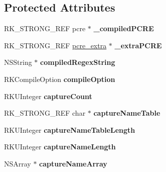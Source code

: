 \subsection*{Protected Attributes}
\begin{DoxyCompactItemize}
\item 
\hypertarget{interface_r_k_regex_aba50ee6e939ad021ecb102f54b8100b9}{R\-K\-\_\-\-S\-T\-R\-O\-N\-G\-\_\-\-R\-E\-F pcre $\ast$ {\bfseries \-\_\-compiled\-P\-C\-R\-E}}\label{interface_r_k_regex_aba50ee6e939ad021ecb102f54b8100b9}

\item 
\hypertarget{interface_r_k_regex_a8e19d0ef588583038126bebf45a48cdd}{R\-K\-\_\-\-S\-T\-R\-O\-N\-G\-\_\-\-R\-E\-F \hyperlink{structpcre__extra}{pcre\-\_\-extra} $\ast$ {\bfseries \-\_\-extra\-P\-C\-R\-E}}\label{interface_r_k_regex_a8e19d0ef588583038126bebf45a48cdd}

\item 
\hypertarget{interface_r_k_regex_ae146bb4ea5f568a5b4ffb541291da639}{N\-S\-String $\ast$ {\bfseries compiled\-Regex\-String}}\label{interface_r_k_regex_ae146bb4ea5f568a5b4ffb541291da639}

\item 
\hypertarget{interface_r_k_regex_a4b15de7c1dadf827b3eb21454686c7f3}{R\-K\-Compile\-Option {\bfseries compile\-Option}}\label{interface_r_k_regex_a4b15de7c1dadf827b3eb21454686c7f3}

\item 
\hypertarget{interface_r_k_regex_a2835832938eec8af92255759fc6278e4}{R\-K\-U\-Integer {\bfseries capture\-Count}}\label{interface_r_k_regex_a2835832938eec8af92255759fc6278e4}

\item 
\hypertarget{interface_r_k_regex_a986245e019741a2c91b2fd6470adef0b}{R\-K\-\_\-\-S\-T\-R\-O\-N\-G\-\_\-\-R\-E\-F char $\ast$ {\bfseries capture\-Name\-Table}}\label{interface_r_k_regex_a986245e019741a2c91b2fd6470adef0b}

\item 
\hypertarget{interface_r_k_regex_a4d23812f239a36f5d6a611ffab3a6938}{R\-K\-U\-Integer {\bfseries capture\-Name\-Table\-Length}}\label{interface_r_k_regex_a4d23812f239a36f5d6a611ffab3a6938}

\item 
\hypertarget{interface_r_k_regex_ac05b2b2d84f5680728b23438c86d9ab5}{R\-K\-U\-Integer {\bfseries capture\-Name\-Length}}\label{interface_r_k_regex_ac05b2b2d84f5680728b23438c86d9ab5}

\item 
\hypertarget{interface_r_k_regex_a0c2a48115226cca8bdeeb1c886d7bbf0}{N\-S\-Array $\ast$ {\bfseries capture\-Name\-Array}}\label{interface_r_k_regex_a0c2a48115226cca8bdeeb1c886d7bbf0}


\end{DoxyCompactItemize}
